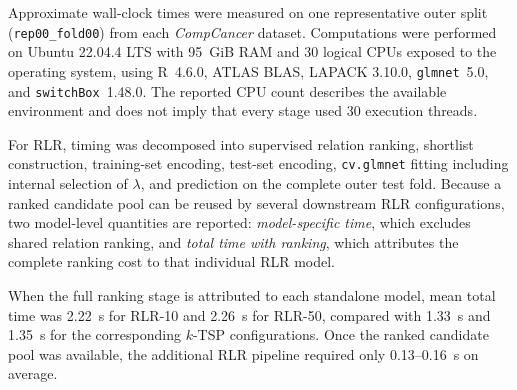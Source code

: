 \documentclass[11pt, a4paper]{article}
\begin{document}
Approximate wall-clock times were measured on one representative outer split (\texttt{rep00\_fold00}) from each \emph{CompCancer} dataset. Computations were performed on Ubuntu 22.04.4 LTS with 95~GiB RAM and 30 logical CPUs exposed to the operating system, using R~4.6.0, ATLAS BLAS, LAPACK 3.10.0, \texttt{glmnet}~5.0, and \texttt{switchBox}~1.48.0. The reported CPU count describes the available environment and does not imply that every stage used 30 execution threads.

For RLR, timing was decomposed into supervised relation ranking, shortlist construction, training-set encoding, test-set encoding, \texttt{cv.glmnet} fitting including internal selection of $\lambda$, and prediction on the complete outer test fold. Because a ranked candidate pool can be reused by several downstream RLR configurations, two model-level quantities are reported: \emph{model-specific time}, which excludes shared relation ranking, and \emph{total time with ranking}, which attributes the complete ranking cost to that individual RLR model.

\begin{table}[!htbp]
\centering
\caption{Approximate model-level runtime summary in the primary \emph{CompCancer} benchmark. Timings use one representative outer split per dataset. For RLR, the relation-count column reports the mean number of globally active relations; for $k$-TSP it reports the mean number of retained voting relations.}
\label{tab:runtime_model_summary}
{\scriptsize
\setlength{\tabcolsep}{3pt}
\renewcommand{\arraystretch}{1.15}
}
\end{table}

When the full ranking stage is attributed to each standalone model, mean total time was 2.22~s for RLR-10 and 2.26~s for RLR-50, compared with 1.33~s and 1.35~s for the corresponding $k$-TSP configurations. Once the ranked candidate pool was available, the additional RLR pipeline required only 0.13--0.16~s on average.
\end{document}
